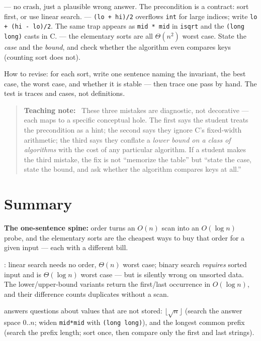 \documentclass[11pt]{article}
\newenvironment{teachingaside}{\begin{quote}\small\color{primary-gold}\textbf{Teaching note:}\ }{\end{quote}}
\begin{document}
 --- no crash, just a plausible wrong answer. The precondition is a contract: sort first, or use linear search.  --- \texttt{(lo + hi)/2} overflows \texttt{int} for large indices; write \texttt{lo + (hi - lo)/2}. The same trap appears as \texttt{mid * mid} in \texttt{isqrt} and the \texttt{(long long)} casts in C.  --- the elementary sorts are all $\Theta(n^2)$ worst case. State the \emph{case} and the \emph{bound}, and check whether the algorithm even compares keys (counting sort does not).

How to revise: for each sort, write one sentence naming the invariant, the best case, the worst case, and whether it is stable --- then trace one pass by hand. The test is traces and cases, not definitions.

\begin{teachingaside}
These three mistakes are diagnostic, not decorative --- each maps to a specific conceptual hole. The first says the student treats the precondition as a hint; the second says they ignore C's fixed-width arithmetic; the third says they conflate a \emph{lower bound on a class of algorithms} with the cost of any particular algorithm. If a student makes the third mistake, the fix is not ``memorize the table'' but ``state the case, state the bound, and ask whether the algorithm compares keys at all.''
\end{teachingaside}

\section{Summary}

\textbf{The one-sentence spine:} order turns an $O(n)$ scan into an $O(\log n)$ probe, and the elementary sorts are the cheapest ways to buy that order for a given input --- each with a different bill.

: linear search needs no order, $\Theta(n)$ worst case; binary search \emph{requires} sorted input and is $\Theta(\log n)$ worst case --- but is silently wrong on unsorted data. The lower/upper-bound variants return the first/last occurrence in $O(\log n)$, and their difference counts duplicates without a scan.

 answers questions about values that are not stored: $\lfloor\sqrt{n}\rfloor$ (search the answer space $0..n$; widen \texttt{mid*mid} with \texttt{(long long)}), and the longest common prefix (search the prefix length; sort once, then compare only the first and last strings).
\end{document}
